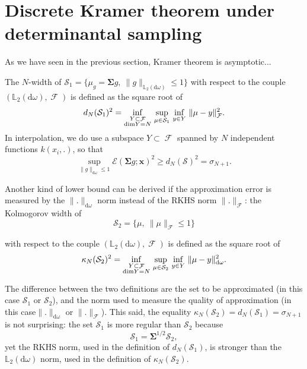 \documentclass[twoside,11pt]{book}
\numberwithin{theorem}{chapter}
\numberwithin{definition}{chapter}
\numberwithin{proposition}{chapter}
\numberwithin{corollary}{chapter}
\numberwithin{example}{chapter}
\numberwithin{lemma}{chapter}
\numberwithin{assumption}{chapter}
\numberwithin{equation}{chapter}
\numberwithin{figure}{chapter}
\DeclareMathOperator{\F}{\mathcal{F}}
\def\Ltwo{\mathbb{L}_{2}(\mathrm{d} \omega)}
\begin{document}
\section{Discrete Kramer theorem under determinantal sampling}

As we have seen in the previous section, Kramer theorem is asymptotic...



 The $N$-width of $\mathcal{S}_{1} = \{ \mu_{g} = \bm{\bm{\Sigma}}g, \: \|g\|_{\Ltwo} \leq 1\}$ with respect to the couple $(\Ltwo, \F)$ is defined as the square root of
\begin{equation}
  d_{N}(\mathcal{S}_{1})^{2}  = \inf\limits_{\substack{Y \subset \F\\ \mathrm{dim}Y = N}}\, \sup\limits_{\mu \in \mathcal{S}_{1}}\, \inf\limits_{y \in Y}\, \|\mu -y \|_{\F}^{2}. \nonumber \\
\end{equation}
In interpolation, we do use a subspace $Y \subset \F$ spanned by $N$ independent functions $k(x_{i},.)$, so that
\begin{equation}
\sup\limits_{\|g\|_{\mathrm{d}\omega} \leq 1} \mathcal{E}(\bm{\Sigma} g;\bm{x})^{2} \geq d_{N}(\mathcal{S})^{2} = \sigma_{N+1}.
\end{equation}

Another kind of lower bound can be derived if the approximation error is measured by the $\|.\|_{\mathrm{d}\omega}$ norm instead of the RKHS norm $\|.\|_{\F}$: the Kolmogorov width of 
\begin{equation}
\mathcal{S}_{2} = \{ \mu, \: \|\mu\|_{\F} \leq 1\}
\end{equation}

 with respect to the couple $(\Ltwo, \F)$ is defined as the square root of
\begin{equation}
  \kappa_{N}(\mathcal{S}_{2})^{2}  = \inf\limits_{\substack{Y \subset \F\\ \mathrm{dim}Y = N}}\, \sup\limits_{\mu \in \mathcal{S}_{2}}\, \inf\limits_{y \in Y}\, \|\mu - y \|_{\mathrm{d}\omega}^{2}. \nonumber \\
\end{equation}

The difference between the two definitions  are the set to be approximated (in this case $\mathcal{S}_{1}$ or $\mathcal{S}_{2}$), and the norm used to measure the quality of approximation (in this case$\|.\|_{\mathrm{d}\omega}$ or $\|.\|_{\F}$). This said, the equality $\kappa_{N}(\mathcal{S}_{2}) = d_{N}(\mathcal{S}_{1}) = \sigma_{N+1}$ is not surprising: the set $\mathcal{S}_{1}$ is more regular than $\mathcal{S}_{2}$ because
\begin{equation}
\mathcal{S}_{1} = \bm{\Sigma}^{1/2} \mathcal{S}_{2},
\end{equation}
yet the RKHS norm, used in the definition of $d_{N}(\mathcal{S}_{1})$, is stronger than the $\Ltwo$ norm, used in the definition of $\kappa_{N}(\mathcal{S}_{2})$.
\end{document}
